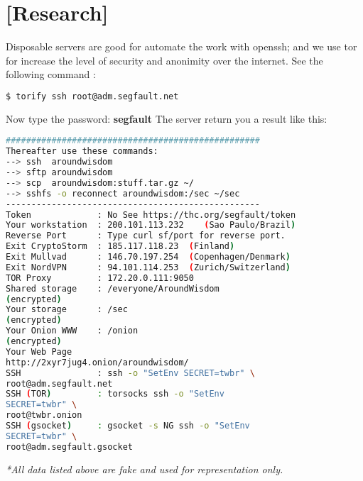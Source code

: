 \documentclass[english,12pt,a4paper,twoside,openright,openany,onecolumn,titlepage,openbib,leqno,fleqn]{article}
\begin{document}
	\section {[Research]}
	\raggedright
	\textnormal{Disposable servers are good for automate the work with openssh; and we use tor for increase the level of security and anonimity over the internet.}
	\noindent See the following command :
	\begin{lstlisting}[language=bash]
$ torify ssh root@adm.segfault.net
	\end{lstlisting}
	{Now type the password:}
	\textbf{segfault}
	\newline 
	{The server return you a result like this:}
\raggedright
	\begin{lstlisting}[language=bash]
##################################################
Thereafter use these commands:
--> ssh  aroundwisdom
--> sftp aroundwisdom
--> scp  aroundwisdom:stuff.tar.gz ~/
--> sshfs -o reconnect aroundwisdom:/sec ~/sec
--------------------------------------------------
Token             : No See https://thc.org/segfault/token
Your workstation  : 200.101.113.232    (Sao Paulo/Brazil)
Reverse Port      : Type curl sf/port for reverse port.
Exit CryptoStorm  : 185.117.118.23  (Finland)
Exit Mullvad      : 146.70.197.254  (Copenhagen/Denmark)
Exit NordVPN      : 94.101.114.253  (Zurich/Switzerland)
TOR Proxy         : 172.20.0.111:9050
Shared storage    : /everyone/AroundWisdom     
(encrypted)
Your storage      : /sec                    
(encrypted)
Your Onion WWW    : /onion                 		
(encrypted)
Your Web Page
http://2xyr7jug4.onion/aroundwisdom/
SSH               : ssh -o "SetEnv SECRET=twbr" \
root@adm.segfault.net
SSH (TOR)         : torsocks ssh -o "SetEnv
SECRET=twbr" \
root@twbr.onion
SSH (gsocket)     : gsocket -s NG ssh -o "SetEnv
SECRET=twbr" \
root@adm.segfault.gsocket
	\end{lstlisting}
	\emph{*All data listed above are fake and used for representation only.} 
	\\
	\newpage 
	\centering
\end{document}
